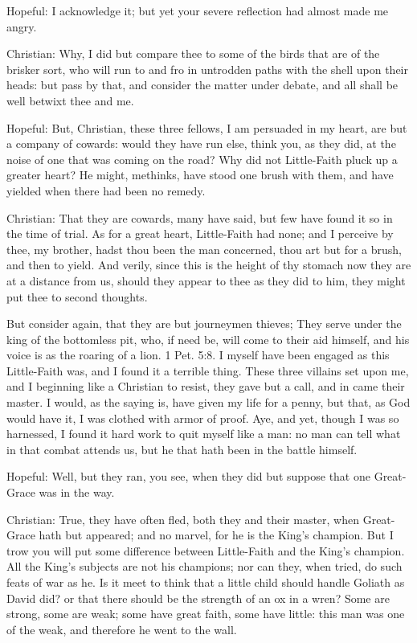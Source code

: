 Hopeful: I acknowledge it; but yet your severe reflection had almost
made me angry.

Christian: Why, I did but compare thee to some of the birds that are of
the brisker sort, who will run to and fro in untrodden paths with the
shell upon their heads: but pass by that, and consider the matter under
debate, and all shall be well betwixt thee and me.

Hopeful: But, Christian, these three fellows, I am persuaded in my
heart, are but a company of cowards: would they have run else, think
you, as they did, at the noise of one that was coming on the road? Why
did not Little-Faith pluck up a greater heart? He might, methinks, have
stood one brush with them, and have yielded when there had been no
remedy.

Christian: That they are cowards, many have said, but few have found it
so in the time of trial. As for a great heart, Little-Faith had none;
and I perceive by thee, my brother, hadst thou been the man concerned,
thou art but for a brush, and then to yield. And verily, since this is
the height of thy stomach now they are at a distance from us, should
they appear to thee as they did to him, they might put thee to second
thoughts.

But consider again, that they are but journeymen thieves; They serve
under the king of the bottomless pit, who, if need be, will come to
their aid himself, and his voice is as the roaring of a lion. 1 Pet.
5:8. I myself have been engaged as this Little-Faith was, and I found
it a terrible thing. These three villains set upon me, and I beginning
like a Christian to resist, they gave but a call, and in came their
master. I would, as the saying is, have given my life for a penny, but
that, as God would have it, I was clothed with armor of proof. Aye, and
yet, though I was so harnessed, I found it hard work to quit myself
like a man: no man can tell what in that combat attends us, but he that
hath been in the battle himself.

Hopeful: Well, but they ran, you see, when they did but suppose that
one Great-Grace was in the way.

Christian: True, they have often fled, both they and their master, when
Great-Grace hath but appeared; and no marvel, for he is the King's
champion. But I trow you will put some difference between Little-Faith
and the King's champion. All the King's subjects are not his champions;
nor can they, when tried, do such feats of war as he. Is it meet to
think that a little child should handle Goliath as David did? or that
there should be the strength of an ox in a wren? Some are strong, some
are weak; some have great faith, some have little: this man was one of
the weak, and therefore he went to the wall.

